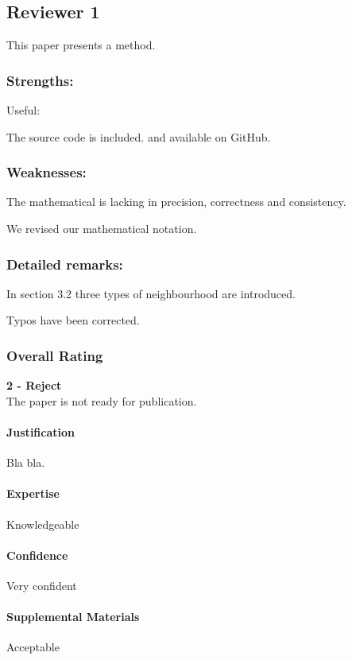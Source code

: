 \subsection{Reviewer 1} \label{sec:rev:1}

This paper presents a method.

\subsubsection{Strengths:}

Useful:

\noindent The source code is included. and available on GitHub.


\subsubsection{Weaknesses:}

The mathematical is lacking in precision, correctness and consistency.

\begin{response} \label{res:rev1:weak:math}
We revised our mathematical notation.
\end{response}


\subsubsection{Detailed remarks:}

In section 3.2 three types of neighbourhood are introduced.

\begin{response} \label{res:rev1:detail:types}
Typos have been corrected.
\end{response}


\subsubsection{Overall Rating}
\textbf{2 - Reject} \\
The paper is not ready for publication.

\paragraph{Justification}
Bla bla.

\paragraph{Expertise}
Knowledgeable

\paragraph{Confidence}
Very confident

\paragraph{Supplemental Materials}
Acceptable
